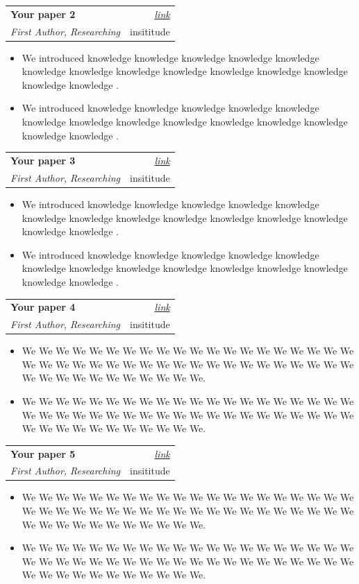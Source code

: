 \documentclass[a4paper,11pt]{article}
\makeatletter
\newcommand{\resumeSubheading}[4]{
\vspace{0.5mm}\item
    \begin{tabular*}{0.98\textwidth}[t]{l@{\extracolsep{\fill}}r}
        \textbf{#1} & \textit{\footnotesize{#4}} \\
        \textit{\footnotesize{#3}} &  \footnotesize{#2}\\
    \end{tabular*}
    \vspace{-2.4mm}
}
\newcommand{\resumeItemListStart}{\begin{justify}\begin{itemize}[leftmargin=3ex, rightmargin=2ex, noitemsep,labelsep=1.2mm,itemsep=0mm]\small}
\newcommand{\resumeItemListEnd}{\end{itemize}\end{justify}\vspace{-2mm}}
\makeatother
\begin{document}
    \resumeSubheading
      {Your paper 2}{insititude}
      {First Author, Researching} {\href{http://www.example.com}{link}}
      \vspace{-2.0mm}
      \resumeItemListStart
    \item {We introduced knowledge knowledge knowledge knowledge knowledge knowledge knowledge knowledge knowledge knowledge knowledge knowledge knowledge knowledge .}
    \item {We introduced knowledge knowledge knowledge knowledge knowledge knowledge knowledge knowledge knowledge knowledge knowledge knowledge knowledge knowledge .}
    \resumeItemListEnd

    \resumeSubheading
      {Your paper 3}{insititude}
      {First Author, Researching} {\href{http://www.example.com}{link}}
      \vspace{-2.0mm}
      \resumeItemListStart
    \item {We introduced knowledge knowledge knowledge knowledge knowledge knowledge knowledge knowledge knowledge knowledge knowledge knowledge knowledge knowledge .}
    \item {We introduced knowledge knowledge knowledge knowledge knowledge knowledge knowledge knowledge knowledge knowledge knowledge knowledge knowledge knowledge .}
    \resumeItemListEnd
    
    \resumeSubheading
      {Your paper 4}{insititude}
      {First Author, Researching} {\href{http://www.example.com}{link}}
      \vspace{-2.0mm}
      \resumeItemListStart
    \item {We We We We We We We We We We We We We We We We We We We We We We We We We We We We We We We We We We We We We We We We We We We We We We We We We We We.}
    \item {We We We We We We We We We We We We We We We We We We We We We We We We We We We We We We We We We We We We We We We We We We We We We We We We We We We.}
    \resumeItemListEnd
  
    \resumeSubheading
      {Your paper 5}{insititude}
      {First Author, Researching} {\href{http://www.example.com}{link}}
      \vspace{-2.0mm}
      \resumeItemListStart
    \item {We We We We We We We We We We We We We We We We We We We We We We We We We We We We We We We We We We We We We We We We We We We We We We We We We We We.}
    \item {We We We We We We We We We We We We We We We We We We We We We We We We We We We We We We We We We We We We We We We We We We We We We We We We We We We.}
    \resumeItemListEnd
    
\end{document}
